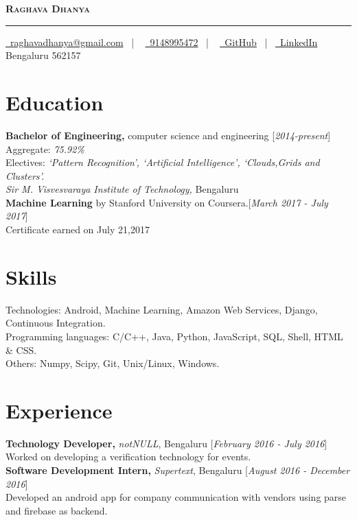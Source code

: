 \documentclass[11pt]{article}
\begin{document}
\thispagestyle{empty}

\begin{center}
    \textbf{\textsc{\Huge Raghava Dhanya}} \rule{\textwidth}{.4pt}
\end{center}

\begin{center}
    \href{mailto:raghavadhanya@gmail.com}{\faEnvelope\ raghavadhanya@gmail.com}
    \ | \ %
    \href{tel:9148995472}{\faPhoneSquare\ 9148995472} \ | \ %
    \href{https://github.com/RaghavaDhanya}{ \underline{\faGithubSquare\
    GitHub}} \ | \ \href{https://in.linkedin.com/in/raghavadhanya}{\underline
    {\faLinkedinSquare\ LinkedIn}} \\
    Bengaluru 562157
\end{center}

\section{Education} \textbf{Bachelor of Engineering,} computer science
and engineering \hfill [\textit{2014-present}]\\
Aggregate:  \textit{75.92\%}\\
Electives:  \textit{`Pattern Recognition', `Artificial Intelligence',
`Clouds,Grids and Clusters'.}\\
\textit{Sir M. Visvesvaraya Institute of Technology,} Bengaluru
\medskip
\\
\textbf{Machine Learning} by Stanford University on Coursera.\hfill [\textit
{March 2017 - July 2017}]\\
Certificate earned on July 21,2017 

\section{Skills} Technologies:  Android, Machine Learning, Amazon Web
Services, Django, Continuous Integration.\\
Programming languages:  C/C++, Java, Python, JavaScript, SQL, Shell,
HTML \& CSS.\\
Others:  Numpy, Scipy, Git, Unix/Linux, Windows. 

\section{Experience} \textbf{Technology Developer,} \textit{notNULL},
Bengaluru \hfill [\textit{February 2016 - July 2016}]\\
Worked on developing a verification technology for events.
\medskip
\\
\textbf{Software Development Intern,} \textit{Supertext}, Bengaluru
\hfill [\textit{August 2016 - December 2016}]\\
Developed an android app for company communication with vendors using
parse and firebase as backend. 
\end{document}
